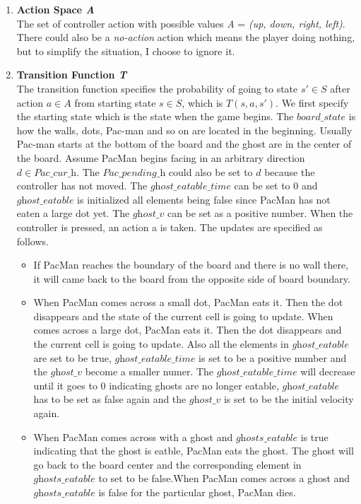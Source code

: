\documentclass{article}
\begin{document}
\begin{enumerate}
\item\textbf{Action Space \textit{A}}\\
The set of controller action with possible values \textit{A} = \textit{(up, down, right, left)}. There could also be a \textit{no-action} action which means the player doing nothing, but to simplify the situation, I choose to ignore it.

\item\textbf{Transition Function \textit{T}}\\
The transition function specifies the probability of going to state $s' \in \textit{S}$ after action $a \in \textit{A}$ from starting state $s \in \textit{S}$, which is $T(s, a, s')$. We first specify the starting state which is the state when the game begins. The $\textit{board\_state}$ is how the walls, dots, Pac-man and so on are located in the beginning. Usually Pac-man starts at the bottom of the board and the ghost are in the center of the board. Assume PacMan begins facing in an arbitrary direction $d \in \textit{Pac\_cur\_h}$. The $\textit{Pac\_pending\_h}$ could also be set to $d$ because the controller has not moved. The $\textit{ghost\_eatable\_time}$ can be set to $0$ and  $\textit{ghost\_eatable}$ is initialized all elements being false since PacMan has not eaten a large dot yet. The $\textit{ghost\_v}$ can be set as a positive number. When the controller is pressed, an action a is taken. The updates are specified as follows.

\begin{itemize}
\item If PacMan reaches the boundary of the board and there is no wall there, it will came back to the board from the opposite side of board boundary.

\item When PacMan comes across a small dot, PacMan eats it. Then the dot disappears and the state of the current cell is going to update. When comes across a large dot, PacMan eats it. Then the dot disappears and the current cell is going to update. Also all the elements in $\textit{ghost\_eatable}$ are set to be true, $\textit{ghost\_eatable\_time}$ is set to be a positive number and the $\textit{ghost\_v}$ become a smaller numer. The $\textit{ghost\_eatable\_time}$ will decrease until it goes to 0 indicating ghosts are no longer eatable, $\textit{ghost\_eatable}$  has to be set as false again and the $\textit{ghost\_v}$ is set to be the initial velocity again.


\item When PacMan comes across with a ghost and $\textit{ghosts\_eatable}$ is true indicating that the ghost is eatble, PacMan eats the ghost. The ghost will  go back to the board center and  the corresponding element in $\textit{ghosts\_eatable}$ to set to be false.When PacMan comes across a ghost and $\textit{ghosts\_eatable}$ is false for the particular ghost, PacMan dies.


\end{itemize}
\end{enumerate}
\end{document}
